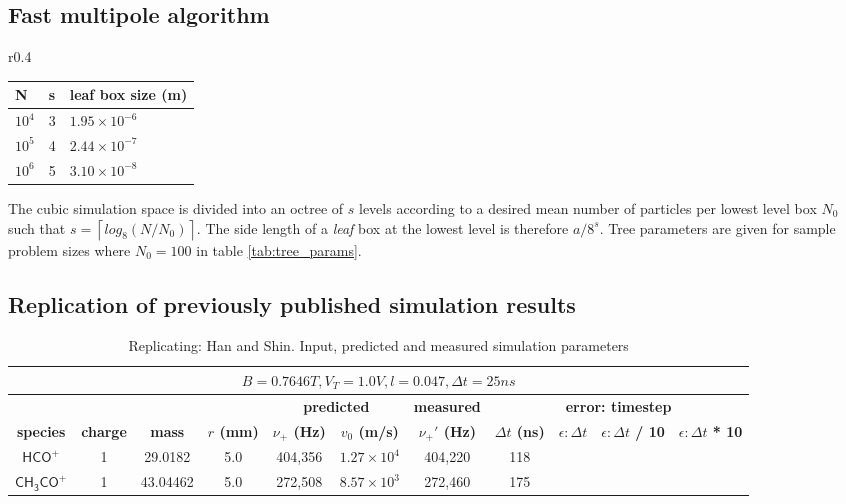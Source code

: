 \documentclass[10pt,conference,onecolumn]{IEEEtran}
\begin{document}
\subsection{Fast multipole algorithm}
\label{sec:fmm}

\begin{wraptable}{r}{0.4\columnwidth}
\label{tab:tree_params}
\begin{tabular}{l|l|l}
\hline \hline
\textbf{N} & \textbf{s} & \textbf{leaf box size} (m) \\
\hline
$10^4$ & 3 & $1.95 \times 10^{-6}$ \\
$10^5$ & 4 & $2.44 \times 10^{-7}$ \\
$10^6$ & 5 & $3.10 \times 10^{-8}$ \\
\hline \hline
\end{tabular}
 \caption{Octree parameters, $N_0 = 100$}
\end{wraptable}

The cubic simulation space is divided into an octree of $s$ levels according to a desired mean number of particles per lowest level box $N_0$ such that $s = \left\lceil log_8(N / N_0) \right\rceil$.
The side length of a \emph{leaf} box at the lowest level is therefore $a / 8^s$.
Tree parameters are given for sample problem sizes where $N_0 = 100$ in table \ref{tab:tree_params}.



\subsection{Replication of previously published simulation results}

\begin{table}[htbp]
 \centering	  	  
 \caption{Replicating: Han and Shin\cite{Han1997}. Input, predicted and measured simulation parameters}
\label{tab:han}
\begin{tabular}{c|c|c|c|c|c|c|c|c|c|c}
 \hline \hline
  \multicolumn{11}{|c|}{$B = 0.7646 T, V_T = 1.0 V, l = 0.047, \Delta t = 25ns$} \\
 \hline \hline
 \multicolumn{4}{|c|}{ } & \multicolumn{2}{|c|}{\textbf{predicted}} & \textbf{measured} & \multicolumn{4}{|c|}{\textbf{error: timestep}} \\ 
 \hline
 \textbf{species} & \textbf{charge} & \textbf{mass} & \textbf{$r$ (mm)} & \textbf{$\nu_+$ (Hz)} & \textbf{$v_0$ (m/s)} & \textbf{$\nu_+'$ (Hz)}  & \textbf{$\Delta t$ (ns)} & \textbf{$\epsilon: \Delta t$}& \textbf{$\epsilon: \Delta t$ / 10} & \textbf{$\epsilon: \Delta t$ * 10}\\ 
 \hline
 $\mathsf{HCO^+}$ & 1 & 29.0182 & 5.0 & 404,356 & $1.27 \times 10^4$ & 404,220 & 118 & \\
 $\mathsf{CH_3CO^+}$ & 1 & 43.04462 & 5.0 & 272,508 & $8.57 \times 10^3$ & 272,460 & 175 & \\
 \hline \hline
\end{tabular}
\end{table}
\end{document}

